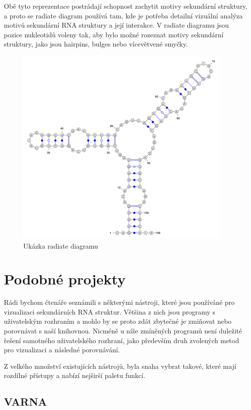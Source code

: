 Obě tyto reprezentace postrádají schopnost zachytit motivy sekundární
struktury, a proto se radiate diagram používá tam, kde je potřeba detailní
vizuální analýza motivů sekundární RNA struktury a její interakce. V radiate
diagramu jsou pozice nukleotidů voleny tak, aby bylo možné rozeznat motivy
sekundární struktury, jako jsou hairpins, bulges nebo vícevětvené smyčky.

\begin{figure}[H]
  \centering
  \includegraphics[height=100mm]{../img/radiate.png}
  \caption{Ukázka radiate diagramu}
\end{figure}

\section{Podobné projekty} 

Rádi bychom čtenáře seznámili s některými nástroji, které jsou používáné pro
vizualizaci sekundárních RNA struktur. Většina z nich jsou programy s
uživatelským rozhraním a mohlo by se proto zdát zbytečné je zmiňovat nebo
porovnávat s naší knihovnou. Nicméně u níže zmíněných programů není duležité
řešení samotného uživatelského rozhraní, jako především druh zvolených metod
pro vizualizaci a následné porovnávání.

Z velkého množství existujících nástrojů, byla snaha vybrat takové,
které mají rozdílné přístupy a nabízí nejširší paletu funkcí.

\subsection{VARNA} 

